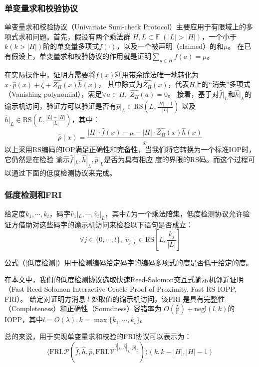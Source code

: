 \documentclass[zihao=-4]{ctexart}
\begin{document}
\subsubsection{单变量求和校验协议}
单变量求和校验协议（Univariate Sum-check Protocol）主要应用于有限域上的多项式求和问题。首先，假设有两个乘法群
$H, L\subset \mathbb{F}\;(|L|>|H|)$，一个小于$k(k>|H|)$阶的单变量多项式$f(\cdot)$，以及一个被声明（claimed）的和$\mu$。
在已有假设上，单变量求和校验协议的作用就是证明$\sum_{a\in H}f(a)=\mu$。\par
在实际操作中，证明方需要将$f(x)$利用带余除法唯一地转化为$x\cdot\hat{p}(x)+\zeta+\hat{Z_H}(x)\hat{h}(x)$，
其中除式为$\hat{Z_H}(x)$，代表$H$上的“消失”多项式（Vanishing polynomial），满足$\forall a\in H,\;\hat{Z_H}(a)=0$。
接着，基于对$\hat{f}|_L$和$\hat{h}|_L$的谕示机访问，验证方可以验证是否有$\hat{p}|_L\in\text{RS}(L,\frac{|H|-1}{|L|})$
以及$\hat{h}|_L\in\text{RS}(L,\frac{|L|-|H|}{|L|})$，其中：
\begin{equation}\hat{p}(x)=\dfrac{|H|\cdot\hat{f}(x)-\mu-|H|\cdot\hat{Z_H}(x)\hat{h}(x)}{x}\end{equation}
以上采用RS编码的IOP满足正确性和完备性\cite{six}，当我们将它转换为一个标准IOP时，它仍然是在检验
谕示$\hat{f}|_L,\hat{h}|_L,\hat{p}|_L$是否为具有相应
度的界限的RS码。而这个过程可以通过下面的低度检测协议来完成。

\subsubsection{低度检测和FRI}
给定度$k_1,\cdots,k_t$，码字$\hat{v}_1|_L,\cdots,\hat{v}_t|_L$，其中$L$为一个乘法陪集，低度检测协议允许验证方借助对这些码字的谕示机访问来检验以下语句是否成立：
\begin{equation}\forall j\in\{0,\cdots,t\},\;\hat{v}_j|_L\in\text{RS}[L,\frac{k_j}{|L|}]\label{低度检测}\end{equation}\par
公式（\ref{低度检测}）用于检测编码给定码字的编码多项式的度是否低于给定的度。\par
在本文中，我们的低度检测协议选取快速Reed-Solomon交互式谕示机邻近证明\cite{three}（Fast Reed-Solomon Interactive Oracle Proof of Proximity, Fast RS IOPP, FRI）。
给定对证明方消息$\;l\;$处取值的谕示机访问，该FRI 是具有完整性（Completeness）和正确性（Soundness）容错率为
$O(\frac{L}{\mathbb{F}})+\text{negl}(l,k)$的IOPP，其中$l=O(\lambda),k=\max\{k_1,\cdots,k_t\}$。\par
总的来说，用于实现单变量求和校验的FRI协议可以表示为：
\begin{equation}\langle \text{FRI}.\mathcal{P}(\hat{f},\hat{h},\hat{p},\text{FRI}.\mathcal{V}^{\hat{f}|_L,\hat{h}|_L,\hat{p}|_L})\rangle(k,k-|H|,|H|-1)\end{equation}\par
\end{document}
